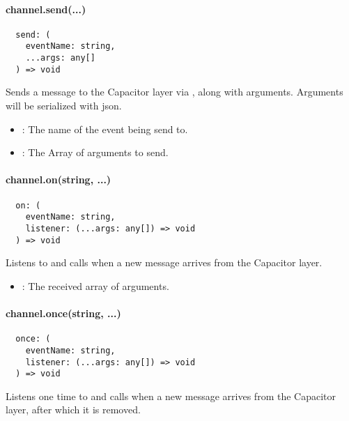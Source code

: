 
\paragraph{channel.send(...)}

\begin{verbatim}
  send: (
    eventName: string,
    ...args: any[]
  ) => void
\end{verbatim}

Sends a message to the Capacitor layer via , along with arguments.
Arguments will be serialized with \ac{json}.

\begin{itemize}
  \setlength\itemsep{-0.8em}
  \item {}: The name of the event being send to.
  \item {}: The Array of arguments to send.
\end{itemize}


\paragraph{channel.on(string, ...)}

\begin{verbatim}
  on: (
    eventName: string,
    listener: (...args: any[]) => void
  ) => void
\end{verbatim}

Listens to  and calls  when a new message arrives from the Capacitor layer.

\begin{itemize}
  \setlength\itemsep{-0.8em}
  \item {}: The received array of arguments.
\end{itemize}


\paragraph{channel.once(string, ...)}

\begin{verbatim}
  once: (
    eventName: string,
    listener: (...args: any[]) => void
  ) => void
\end{verbatim}

Listens one time to  and calls  when a new message arrives from the Capacitor layer, after which it is removed.

